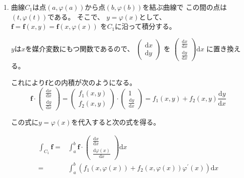\documentclass[12pt,b5paper]{ltjsarticle}
\begin{document}
\begin{enumerate}
 \item
      曲線$C_1$は点$(a,\varphi(a))$から点$(b,\varphi(b))$を結ぶ曲線で
      この間の点は$(t,\varphi(t))$である。
      そこで、
      $y=\varphi(x)$として、
      $\bm{f}=\bm{f}(x,y)=\bm{f}(x,\varphi(x))$
      を$C_1$に沿って積分する。

      $y$は$x$を媒介変数にもつ関数であるので、
      $\begin{pmatrix}\mathrm{d}x\\\mathrm{d}y\end{pmatrix}$
      を
      $\begin{pmatrix}\frac{\mathrm{d}x}{\mathrm{d}x}\\\frac{\mathrm{d}y}{\mathrm{d}x}\end{pmatrix}\mathrm{d}x$
      に置き換える。

      これにより$\bm{f}$との内積が次のようになる。
      \begin{equation}
       \bm{f}\cdot \begin{pmatrix}\frac{\mathrm{d}x}{\mathrm{d}x}\\\frac{\mathrm{d}y}{\mathrm{d}x}\end{pmatrix}
       = \begin{pmatrix}f_1(x,y)\\f_2(x,y)\end{pmatrix}
      \cdot \begin{pmatrix}1\\\frac{\mathrm{d}y}{\mathrm{d}x}\end{pmatrix}
      = f_1(x,y)+f_2(x,y)\frac{\mathrm{d}y}{\mathrm{d}x}
      \end{equation}

      この式に$y=\varphi(x)$を代入すると次の式を得る。

      \begin{align}
       \int_{C_1}\bm{f}
       =& \int_{a}^{b}\bm{f}
             \cdot\begin{pmatrix}\frac{\mathrm{d}x}{\mathrm{d}x}\\\frac{\mathrm{d}\varphi(x)}{\mathrm{d}x}\end{pmatrix}\mathrm{d}x\\
       =& \int_{a}^{b}
       \left(f_1(x,\varphi(x)) + f_2(x,\varphi(x))\varphi^{\prime}(x)\right)\mathrm{d}x
      \end{align}



\end{enumerate}
\end{document}
